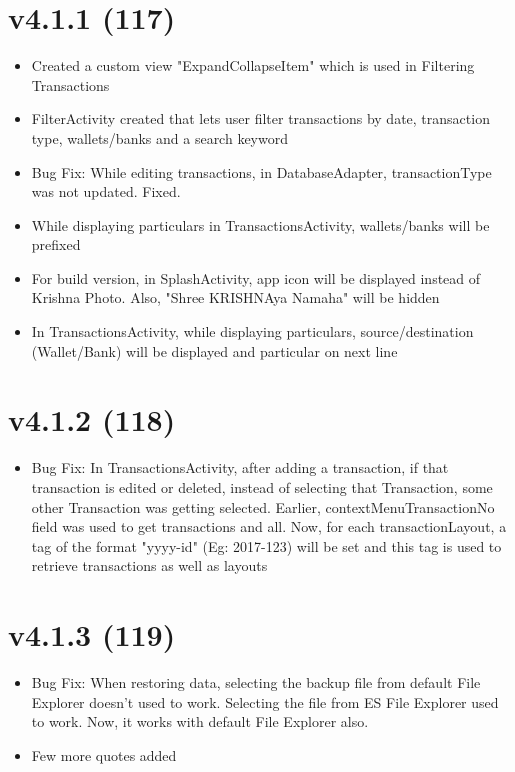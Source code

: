 \documentclass{article}
\begin{document}
\section{v4.1.1 (117)}
\begin{itemize}
\item Created a custom view "ExpandCollapseItem" which is used in Filtering Transactions
\item FilterActivity created that lets user filter transactions by date, transaction type, wallets/banks and a search keyword
\item Bug Fix: While editing transactions, in DatabaseAdapter, transactionType was not updated. Fixed.
\item While displaying particulars in TransactionsActivity, wallets/banks will be prefixed
\item For build version, in SplashActivity, app icon will be displayed instead of Krishna Photo. Also, "Shree KRISHNAya Namaha" will be hidden
\item In TransactionsActivity, while displaying particulars, source/destination (Wallet/Bank) will be displayed and particular on next line
\end{itemize}

\section{v4.1.2 (118)}
\begin{itemize}
\item Bug Fix: In TransactionsActivity, after adding a transaction, if that transaction is edited or deleted, instead of selecting that Transaction, some other Transaction was getting selected. Earlier, contextMenuTransactionNo field was used to get transactions and all. Now, for each transactionLayout, a tag of the format "yyyy-id" (Eg: 2017-123) will be set and this tag is used to retrieve transactions as well as layouts
\end{itemize}

\section{v4.1.3 (119)}
\begin{itemize}
\item Bug Fix: When restoring data, selecting the backup file from default File Explorer doesn't used to work. Selecting the file from ES File Explorer used to work. Now, it works with default File Explorer also.
\item Few more quotes added
\end{itemize}
\end{document}
